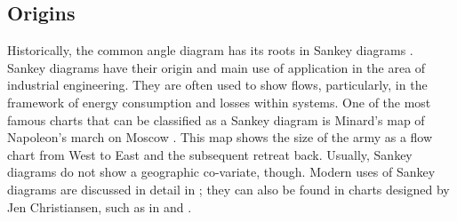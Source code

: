 \subsection{Origins}
Historically, the common angle diagram has its roots in Sankey diagrams \citep{sankey:1898}. Sankey diagrams have their origin and main use of application in the area of industrial engineering. They are often used to show flows,  particularly, in the framework of energy consumption and losses within systems.
One of the most famous charts that can be classified as a Sankey diagram is Minard's map of Napoleon's march on Moscow \citep{minard:1812}. This map  shows the size of the army as a flow chart from West to East and the subsequent retreat back. Usually, Sankey diagrams do not show a geographic co-variate, though. Modern uses of Sankey diagrams are discussed in  detail in \citep{schmidt:2008};  they can also be found in charts designed by Jen Christiansen, such as in \cite{jen3} and \cite{jen2}.

%


